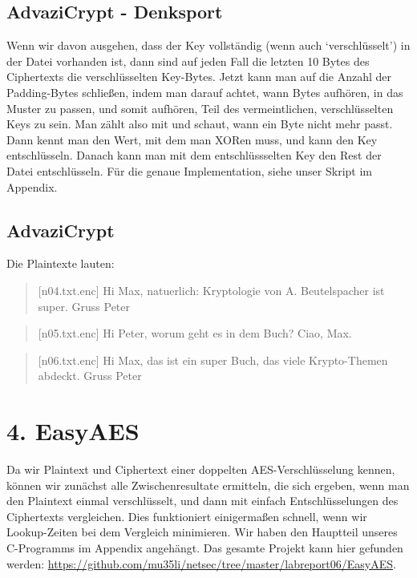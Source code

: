 \documentclass[10pt,a4paper]{article}
\begin{document}
\subsection{AdvaziCrypt - Denksport}
Wenn wir davon ausgehen, dass der Key vollständig (wenn auch `verschlüsselt') in der Datei vorhanden ist,
dann sind auf jeden Fall die letzten 10 Bytes des Ciphertexts die verschlüsselten Key-Bytes. Jetzt kann man
auf die Anzahl der Padding-Bytes schließen, indem man darauf achtet, wann Bytes aufhören, in das Muster zu passen,
und somit aufhören, Teil
des vermeintlichen, verschlüsselten Keys zu sein. Man zählt also mit und schaut, wann ein Byte nicht mehr passt.
Dann kennt man den Wert, mit dem man XORen muss, und kann den Key entschlüsseln. Danach kann man mit dem entschlüssselten Key
den Rest der Datei entschlüsseln.
Für die genaue Implementation, siehe unser Skript im Appendix.

\subsection{AdvaziCrypt}
Die Plaintexte lauten:
\begin{quote}[n04.txt.enc]
Hi Max, natuerlich: Kryptologie von A. Beutelspacher ist super. Gruss Peter
\end{quote}
\begin{quote}[n05.txt.enc]
Hi Peter, worum geht es in dem Buch? Ciao, Max.
\end{quote}
\begin{quote}[n06.txt.enc]
Hi Max, das ist ein super Buch, das viele Krypto-Themen abdeckt. Gruss Peter
\end{quote}

\setcounter{section}{4}
\section*{4. EasyAES}
\setcounter{subsection}{0}

Da wir Plaintext und Ciphertext einer doppelten AES-Verschlüsselung kennen, können wir zunächst alle
Zwischenresultate ermitteln, die sich ergeben, wenn man den Plaintext einmal verschlüsselt, und dann
mit einfach Entschlüsselungen des Ciphertexts vergleichen. Dies funktioniert einigermaßen schnell,
wenn wir Lookup-Zeiten bei dem Vergleich minimieren. Wir haben den Hauptteil unseres C-Programms im Appendix
angehängt. Das gesamte Projekt kann hier gefunden werden: \url{https://github.com/mu35li/netsec/tree/master/labreport06/EasyAES}.
\end{document}
